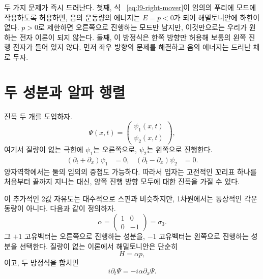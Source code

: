 두 가지 문제가 즉시 드러난다. 첫째, 식 ~\eqref{eq:l9-right-mover}이 임의의 푸리에 모드에 작용하도록 허용하면, 음의 운동량의 에너지는 \(E=p<0\)가 되어 해밀토니안에 하한이 없다. \(p>0\)로 제한하면 오른쪽으로 진행하는 모드만 남지만, 이것만으로는 우리가 원하는 전자 이론이 되지 않는다. 둘째, 이 방정식은 한쪽 방향만 허용해 보통의 왼쪽 진행 전자가 들어 있지 않다. 먼저 좌우 방향의 문제를 해결하고 음의 에너지는 드러난 채로 두자.

\section{두 성분과 알파 행렬}

진폭 두 개를 도입하자.
\begin{equation}
\Psi(x,t)=
\begin{pmatrix}
\psi_1(x,t)\\[3pt]
\psi_2(x,t)
\end{pmatrix},
\end{equation}
여기서 질량이 없는 극한에 \(\psi_1\)는 오른쪽으로, \(\psi_2\)는 왼쪽으로 진행한다.
\begin{align}
(\partial_t+\partial_x)\psi_1&=0,
&
(\partial_t-\partial_x)\psi_2&=0.
\end{align}
양자역학에서는 둘의 임의의 중첩도 가능하다. 따라서 입자는 고전적인 꼬리표 하나를 처음부터 끝까지 지니는 대신, 양쪽 진행 방향 모두에 대한 진폭을 가질 수 있다.

이 추가적인 2값 자유도는 대수적으로 스핀과 비슷하지만, 1차원에서는 통상적인 각운동량이 아니다. 다음과 같이 정의하자.
\begin{equation}
\alpha=
\begin{pmatrix}
1&0\\
0&-1
\end{pmatrix}
=\sigma_3.
\label{eq:l9-alpha}
\end{equation}
그 \(+1\) 고유벡터는 오른쪽으로 진행하는 성분을, \(-1\) 고유벡터는 왼쪽으로 진행하는 성분을 선택한다. 질량이 없는 이론에서 해밀토니안은 단순히
\begin{equation}
H=\alpha p,
\end{equation}
이고, 두 방정식을 합치면
\begin{equation}
i\partial_t\Psi=-i\alpha\partial_x\Psi.
\label{eq:l9-massless-dirac}
\end{equation}

\begin{classroomqa}
\end{classroomqa}

